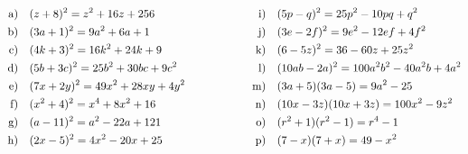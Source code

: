 \begin{exercise}
    \newcommand{\solutionN} { \text{n)}&\quad (10x-3z)(10x+3z)=100x^2-9z^2           }
    \newcommand{\solutionO} { \text{o)}&\quad   (r^2+1)(r^2-1)=r^4-1                 }
    \newcommand{\solutionP} { \text{p)}&\quad       (7-x)(7+x)=49-x^2                }
    {\small
    \begin{alignat*}{5}
      \solutionA & \qquad&\qquad & \solutionI \\
      \solutionB & \qquad&\qquad & \solutionJ \\
      \solutionC & \qquad&\qquad & \solutionK \\
      \solutionD & \qquad&\qquad & \solutionL \\
      \solutionE & \qquad&\qquad & \solutionM \\
      \solutionF & \qquad&\qquad & \solutionN \\
      \solutionG & \qquad&\qquad & \solutionO \\
      \solutionH & \qquad&\qquad & \solutionP
    \end{alignat*}%
    }%
  \fi
\end{exercise}
